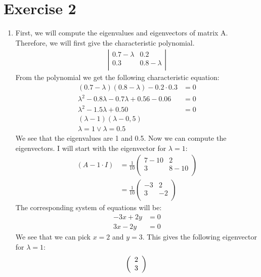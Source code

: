\documentclass[a4paper]{article}
\begin{document}
\section*{Exercise 2}
\begin{enumerate}
  \item First, we will compute the eigenvalues and eigenvectors of matrix A. Therefore, we will first give the characteristic polynomial.
  \begin{align*}
  \left|
  \begin{array}{cc}
  0.7 - \lambda & 0.2 \\
  0.3 & 0.8 - \lambda \\
  \end{array}
  \right|
  \end{align*}
  From the polynomial we get the following characteristic equation:
  \begin{align*}
    (0.7 - \lambda)(0.8 - \lambda) - 0.2 \cdot 0.3 &= 0 \\
    \lambda^2 - 0.8 \lambda - 0.7 \lambda + 0.56 - 0.06 &= 0 \\
    \lambda^2 - 1.5 \lambda + 0.50 &= 0 \\
    (\lambda - 1)(\lambda - 0,5) \\
    \lambda = 1 \lor \lambda = 0.5
  \end{align*}
  We see that the eigenvalues are 1 and 0.5. Now we can compute the eigenvectors. I will start with the eigenvector for $\lambda = 1$:
  \begin{align*}
    (A - 1 \cdot I) &=
    \frac{1}{10}
    \left(
    \begin{array}{cc}
    7 - 10 & 2 \\
    3 & 8 - 10 \\
    \end{array}
    \right) \\
    &=
    \frac{1}{10}
    \left(
    \begin{array}{cc}
    -3 & 2 \\
    3 & -2 \\
    \end{array}
    \right)
  \end{align*}
  The corresponding system of equations will be:
  \begin{align*}
    -3x + 2y &= 0 \\
    3x - 2y &= 0
  \end{align*}
  We see that we can pick $x = 2$ and $y = 3$. This gives the following eigenvector for $\lambda = 1$:
  \[
  \left(
  \begin{array}{c}
  2 \\
  3 \\
  \end{array}
  \right) \\
  \]


\end{enumerate}
\end{document}
